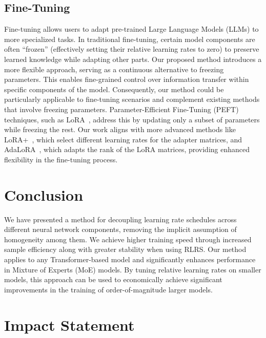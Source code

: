 \documentclass{article}
\theoremstyle{plain}
\theoremstyle{definition}
\theoremstyle{remark}
\newcommand{\jl}[1]{\textcolor{green}{[JL: #1]}}
\begin{document}
    \subsection{Fine-Tuning}
    Fine-tuning allows users to adapt pre-trained Large Language Models (LLMs) to more specialized tasks. In traditional fine-tuning, certain model components are often ``frozen'' (effectively setting their relative learning rates to zero) to preserve learned knowledge while adapting other parts. Our proposed method introduces a more flexible approach, serving as a continuous alternative to freezing parameters. This enables fine-grained control over information transfer within specific components of the model. Consequently, our method could be particularly applicable to fine-tuning scenarios and complement existing methods that involve freezing parameters. Parameter-Efficient Fine-Tuning (PEFT) techniques, such as LoRA~\citep{hu2021lora}, address this by updating only a subset of parameters while freezing the rest. Our work aligns with more advanced methods like LoRA+~\citep{hayou2024lora+}, which select different learning rates for the adapter matrices, and AdaLoRA~\citep{zhang2023adalora}, which adapts the rank of the LoRA matrices, providing enhanced flexibility in the fine-tuning process.
    
    
    \section{Conclusion}
    
    We have presented a method for decoupling learning rate schedules across different neural network components, removing the implicit assumption of homogeneity among them. We achieve higher training speed through increased sample efficiency along with greater stability when using RLRS.
    Our method applies to any Transformer-based model and significantly enhances performance in Mixture of Experts (MoE) models. By tuning relative learning rates on smaller models, this approach can be used to economically achieve significant improvements in the training of order-of-magnitude larger models. 
    
    \section*{Impact Statement}
    
\end{document}
